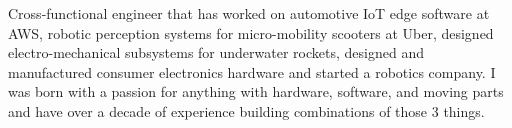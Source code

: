

\begin{cvparagraph}

Cross-functional engineer that has worked on automotive IoT edge software at
  AWS,  robotic perception systems for micro-mobility scooters at Uber, designed
  electro-mechanical subsystems for underwater rockets, designed and
  manufactured consumer electronics hardware and started a robotics company. I
  was born with a passion for anything with hardware, software, and moving parts
  and have over a decade of experience building combinations of those 3 things.
\end{cvparagraph}
